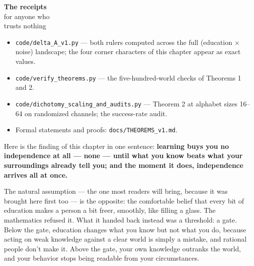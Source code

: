 \begin{receipts}{\textbf{The receipts}\\for anyone who\\trusts nothing}


\begin{itemize}
\tightlist
\item
  \texttt{code/\allowbreak{}delta\_\allowbreak{}A\_\allowbreak{}v1.\allowbreak{}py} --- both rulers computed across the full
  (education × noise) landscape; the four corner characters of this
  chapter appear as exact values.
\item
  \texttt{code/\allowbreak{}verify\_\allowbreak{}theorems.\allowbreak{}py} --- the five-hundred-world checks of
  Theorems 1 and 2.
\item
  \texttt{code/\allowbreak{}dichotomy\_\allowbreak{}scaling\_\allowbreak{}and\_\allowbreak{}audits.\allowbreak{}py} --- Theorem 2 at alphabet sizes
  16--64 on randomized channels; the success-rate audit.
\item
  Formal statements and proofs: \texttt{docs/\allowbreak{}THEOREMS\_\allowbreak{}v1.\allowbreak{}md}.
\end{itemize}

\end{receipts}




Here is the finding of this chapter in one sentence: \textbf{learning buys you
no independence at all --- none --- until what you know beats what your
surroundings already tell you; and the moment it does, independence
arrives all at once.}

The natural assumption --- the one most readers will bring, because it
was brought here first too --- is the opposite: the comfortable belief that every bit of education makes a person a bit
freer, smoothly, like filling a glass. The mathematics refused it. What it
handed back instead was a threshold: a gate. Below the gate, education
changes what you know but not what you do, because acting on weak
knowledge against a clear world is simply a mistake, and rational people
don't make it. Above the gate, your own knowledge outranks the world,
and your behavior stops being readable from your circumstances.

